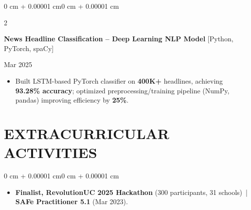 \documentclass[10pt, letterpaper]{article}
\newenvironment{highlights}{
    \begin{itemize}[
        topsep=0.10 cm,
        parsep=0.06 cm,
        partopsep=0pt,
        itemsep=0.06 cm,
        leftmargin=12pt
    ]
}{
    \end{itemize}
}
\newenvironment{onecolentry}{
    \begin{adjustwidth}{0 cm + 0.00001 cm}{0 cm + 0.00001 cm}
}{
    \end{adjustwidth}
}
\newenvironment{twocolentry}[2][]{
    \onecolentry
    \def\secondColumn{#2}
    \setcolumnwidth{\fill, 4.5 cm}
    \begin{paracol}{2}
}{
    \switchcolumn \raggedleft \secondColumn
    \end{paracol}
    \endonecolentry
}
\begin{document}
\vspace{0.12 cm}

\begin{twocolentry}{Mar 2025}
\textbf{News Headline Classification -- Deep Learning NLP Model} [Python, PyTorch, spaCy]
\end{twocolentry}
\begin{highlights}
  \item Built LSTM-based PyTorch classifier on \textbf{400K+} headlines, achieving \textbf{93.28\% accuracy}; optimized preprocessing/training pipeline (NumPy, pandas) improving efficiency by \textbf{25\%}.
\end{highlights}

\section{EXTRACURRICULAR ACTIVITIES}
\begin{onecolentry}
\begin{highlights}
  \item \textbf{Finalist, RevolutionUC 2025 Hackathon} (300 participants, 31 schools) \,|\, \textbf{SAFe Practitioner 5.1} (Mar 2023).
\end{highlights}
\end{onecolentry}
\end{document}
